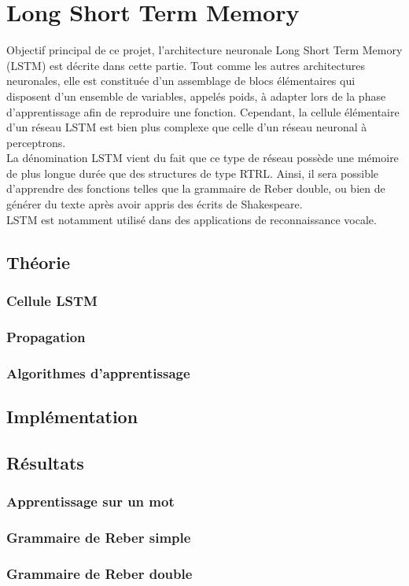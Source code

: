 
\chapter{Long Short Term Memory}
Objectif principal de ce projet, l'architecture neuronale Long Short Term Memory (LSTM) est décrite dans cette partie.
Tout comme les autres architectures neuronales, elle est constituée d'un assemblage de blocs élémentaires qui disposent d'un
ensemble de variables, appelés poids, à adapter lors de la phase d'apprentissage afin de reproduire une fonction.
Cependant, la cellule élémentaire d'un réseau LSTM est bien plus complexe que celle d'un réseau neuronal à perceptrons. \\

La dénomination LSTM vient du fait que ce type de réseau possède une mémoire de plus longue durée que des structures de type RTRL.
Ainsi, il sera possible d'apprendre des fonctions telles que la grammaire de Reber double, ou bien de générer du texte après avoir appris
des écrits de Shakespeare. \\
LSTM est notamment utilisé dans des applications de reconnaissance vocale.

\section{Théorie}
\subsection{Cellule LSTM}
\subsection{Propagation}
\subsection{Algorithmes d'apprentissage}

\section{Implémentation}

\section{Résultats}
\subsection{Apprentissage sur un mot}
\subsection{Grammaire de Reber simple}
\subsection{Grammaire de Reber double}
